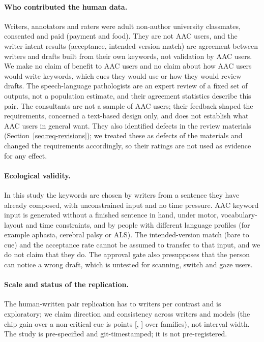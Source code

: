 \paragraph{Who contributed the human data.}
Writers, annotators and raters were adult non-author university classmates, consented and paid (payment and food).
They are not AAC users, and the writer-intent results (acceptance, intended-version match) are agreement between writers and drafts built from their own keywords, not validation by AAC users.
We make no claim of benefit to AAC users and no claim about how AAC users would write keywords, which cues they would use or how they would review drafts.
The \jmdesignSlp{} speech-language pathologists are an expert review of a fixed set of outputs, not a population estimate, and their agreement statistics describe this pair.
The \jmdesignConsultants{} consultants are not a sample of AAC users; their feedback shaped the requirements, concerned a text-based design only, and does not establish what AAC users in general want.
They also identified defects in the review materials (Section~\ref{sec:req-revisions}); we treated these as defects of the materials and changed the requirements accordingly, so their ratings are not used as evidence for any effect.

\paragraph{Ecological validity.}
In this study the keywords are chosen by writers from a sentence they have already composed, with unconstrained input and no time pressure. AAC keyword input is generated without a finished sentence in hand, under motor, vocabulary-layout and time constraints, and by people with different language profiles (for example aphasia, cerebral palsy or ALS). The intended-version match (bare to cue) and the acceptance rate cannot be assumed to transfer to that input, and we do not claim that they do. The approval gate also presupposes that the person can notice a wrong draft, which is untested for scanning, switch and gaze users.

\paragraph{Scale and status of the replication.}
The human-written pair replication has \jmhwChipGainWriters{} to \jmhwAffShareWriters{} writers per contrast and is exploratory; we claim direction and consistency across writers and models (the chip gain over a non-critical cue is \jmhwChipGain{} points [\jmhwChipGainLo{}, \jmhwChipGainHi{}] over \jmhwChipGainFamilies{} families), not interval width.
The study is pre-specified and git-timestamped; it is not pre-registered.

